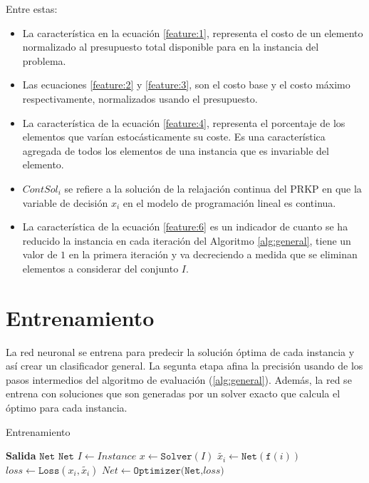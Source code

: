 \documentclass[spanish, a4paper, 12pt, openany,final]{book}
\begin{document}
Entre estas:
\begin{itemize}
	\item La característica en la ecuación \eqref{feature:1}, representa el costo de un elemento normalizado al presupuesto total disponible para en la instancia del problema.
	\item Las ecuaciones \eqref{feature:2} y \eqref{feature:3}, son el costo base y el costo máximo respectivamente, normalizados usando el presupuesto.
	\item La característica de la ecuación \eqref{feature:4}, representa el porcentaje de los elementos que varían estocásticamente su coste. Es una característica agregada de todos los elementos de una instancia que es invariable del elemento.
	
	\item $ContSol_i$ se refiere a la solución de la relajación continua del PRKP en que la variable de decisión $x_i$ en el modelo de programación lineal es continua.
	
	\item La característica de la ecuación \eqref{feature:6} es un indicador de cuanto se ha reducido la instancia en cada iteración del Algoritmo \ref{alg:general}, tiene un valor de $1$ en la primera iteración y va decreciendo a medida que se eliminan elementos a considerar del conjunto $I$.
	
\end{itemize}


\section{Entrenamiento}
\label{section:training}

La red neuronal se entrena para predecir la solución óptima de cada instancia y así crear un clasificador general. La segunta etapa afina la precisión usando de los pasos intermedios del algoritmo de evaluación (\ref{alg:general}). Además, la red se entrena con soluciones que son generadas por un solver exacto que calcula el óptimo para cada instancia. 

\begin{algorithm}[H]
	\caption{Entrenamiento}\label{alg:training}
	\begin{algorithmic}[1]
		\Statex \textbf{Salida} $\texttt{Net}$
		\label{line:loss}
		\State $\texttt{Net}$ \label{line:def_net}
		   \label{line:startloop}
		\State $I \gets Instance$ \label{line:i_from_instance}
		\State $x \gets \texttt{Solver}(I)$\label{line:solveinstance}
		 \label{line:startinnerloop}
		\State $\tilde{x_i} \gets \texttt{Net}(\texttt{f}(i))$   \label{line:prediction}
		\State $loss \gets \texttt{Loss}(x_i,\tilde{x_i})$ \label{line:calculateloss}
		\State $Net \gets \texttt{Optimizer(Net,$loss$)}$ \label{line:optimizationstep}
		\EndFor \label{line:endinnerloop}
		\EndFor \label{line:endloop}
	\end{algorithmic}
\end{algorithm}
\end{document}
